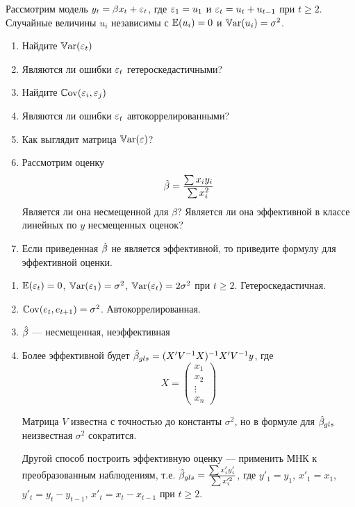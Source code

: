 \begin{problem}
Рассмотрим модель $y_t=\beta x_t +\varepsilon_t$, где $\varepsilon_1=u_1$ и $\varepsilon_t=u_t+u_{t-1}$ при $t\geq 2$. Случайные величины $u_i$ независимы с $\operatorname{\mathbb{E}}(u_i)=0$ и $\operatorname{\mathbb{V}\mathrm{ar}}(u_i)=\sigma^2$.
\begin{enumerate}
\item Найдите $\operatorname{\mathbb{V}\mathrm{ar}}(\varepsilon_t)$
\item Являются ли ошибки $\varepsilon_t$ гетероскедастичными?
\item Найдите $\operatorname{\mathbb{C}\mathrm{ov}}(\varepsilon_i,\varepsilon_j)$
\item Являются ли ошибки $\varepsilon_t$ автокоррелированными?
\item Как выглядит матрица $\operatorname{\mathbb{V}\mathrm{ar}}(\varepsilon)$?
\item Рассмотрим оценку
\[
\hat{\beta}=\frac{\sum x_i y_i}{\sum x_i^2}
\]
Является ли она несмещенной для $\beta$? Является ли она эффективной в классе линейных по $y$ несмещенных оценок?
\item Если приведенная $\hat{\beta}$ не является эффективной, то приведите формулу для эффективной оценки.
\end{enumerate}

\begin{sol}
\begin{enumerate}
\item $\operatorname{\mathbb{E}}(\varepsilon_t)=0$, $\operatorname{\mathbb{V}\mathrm{ar}}(\varepsilon_1)=\sigma^2$, $\operatorname{\mathbb{V}\mathrm{ar}}(\varepsilon_t)=2\sigma^2$ при $t\geq 2$.  Гетероскедастичная.
\item $\operatorname{\mathbb{C}\mathrm{ov}}(e_t,e_{t+1})=\sigma^2$. Автокоррелированная.
\item $\hat{\beta}$ — несмещенная, неэффективная
\item Более эффективной будет $\hat{\beta}_{gls}=(X'V^{-1}X)^{-1}X'V^{-1}y$, где
\[
X=\begin{pmatrix}
x_1 \\
x_2 \\
\vdots \\
x_n
\end{pmatrix}
\]

Матрица $V$ известна с точностью до константы $\sigma^2$, но в формуле для $\hat{\beta}_{gls}$ неизвестная $\sigma^2$ сократится.

Другой способ построить эффективную оценку — применить МНК к преобразованным наблюдениям, т.е. $\hat{\beta}_{gls}=\frac{\sum x'_i y'_i}{\sum x_i^{\prime 2}}$, где $y'_1=y_1$, $x'_1=x_1$, $y'_t=y_t-y_{t-1}$, $x'_t=x_t-x_{t-1}$ при $t\geq 2$.
\end{enumerate}
\end{sol}
\end{problem}



